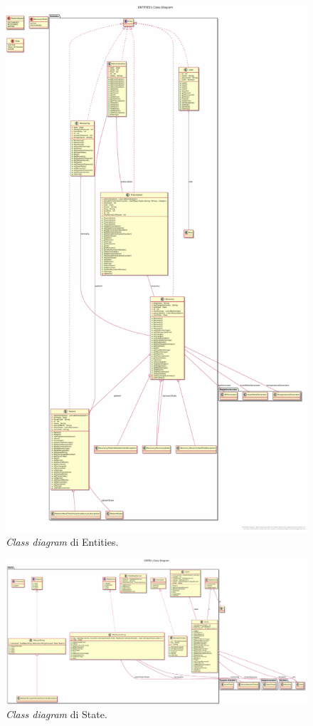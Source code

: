 \documentclass[final, smallexted]{svjour3}
\begin{document}
\begin{figure}
	\includegraphics[scale=.28]{ClassDiagramImages/Entities.pdf}
	\caption{\textit{Class diagram} di Entities.}\label{entitiesclassdiagram}
\end{figure}


\begin{landscape}
\begin{figure}
	\includegraphics[scale=.38]{ClassDiagramImages/State.pdf}
	\caption{\textit{Class diagram} di State.}\label{stateclassdiagram}
\end{figure}
\end{landscape}
\end{document}

